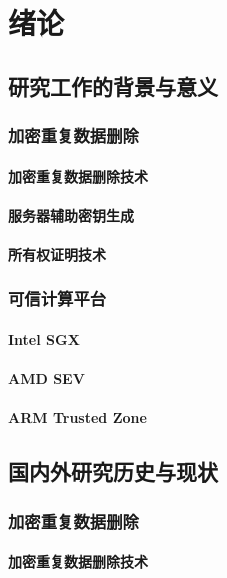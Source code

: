 \chapter{绪\hspace{6pt}论}

\section{研究工作的背景与意义}

\subsection{加密重复数据删除}
\subsubsection{加密重复数据删除技术}
\subsubsection{服务器辅助密钥生成}
\subsubsection{所有权证明技术}
\subsection{可信计算平台}
\subsubsection{Intel SGX}
\subsubsection{AMD SEV}
\subsubsection{ARM Trusted Zone}

\cite{ren2021accelerating}
\section{国内外研究历史与现状}

\subsection{加密重复数据删除}
\subsubsection{加密重复数据删除技术}
